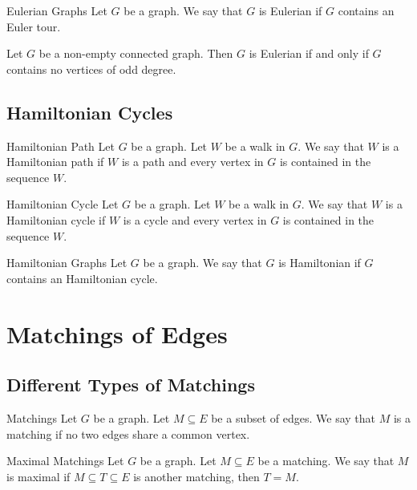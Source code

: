 \documentclass[a4paper]{article}
\begin{document}
\begin{defn}{Eulerian Graphs}{} Let $G$ be a graph. We say that $G$ is Eulerian if $G$ contains an Euler tour. 
\end{defn}

\begin{prp}{}{} Let $G$ be a non-empty connected graph. Then $G$ is Eulerian if and only if $G$ contains no vertices of odd degree. 
\end{prp}

\subsection{Hamiltonian Cycles}
\begin{defn}{Hamiltonian Path}{} Let $G$ be a graph. Let $W$ be a walk in $G$. We say that $W$ is a Hamiltonian path if $W$ is a path and every vertex in $G$ is contained in the sequence $W$. 
\end{defn}

\begin{defn}{Hamiltonian Cycle}{} Let $G$ be a graph. Let $W$ be a walk in $G$. We say that $W$ is a Hamiltonian cycle if $W$ is a cycle and every vertex in $G$ is contained in the sequence $W$. 
\end{defn}

\begin{defn}{Hamiltonian Graphs}{} Let $G$ be a graph. We say that $G$ is Hamiltonian if $G$ contains an Hamiltonian cycle. 
\end{defn}

\pagebreak
\section{Matchings of Edges}
\subsection{Different Types of Matchings}
\begin{defn}{Matchings}{} Let $G$ be a graph. Let $M\subseteq E$ be a subset of edges. We say that $M$ is a matching if no two edges share a common vertex. 
\end{defn}

\begin{defn}{Maximal Matchings}{} Let $G$ be a graph. Let $M\subseteq E$ be a matching. We say that $M$ is maximal if $M\subseteq T\subseteq E$ is another matching, then $T=M$. 
\end{defn}
\end{document}
